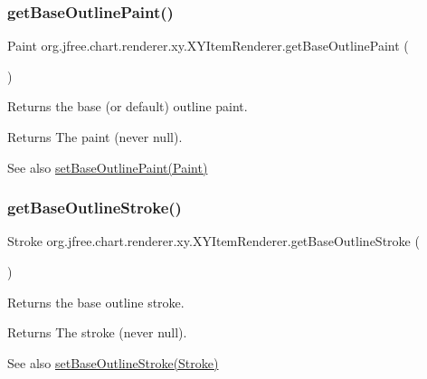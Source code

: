 \subsubsection{\texorpdfstring{get\+Base\+Outline\+Paint()}{getBaseOutlinePaint()}}
{\footnotesize\ttfamily Paint org.\+jfree.\+chart.\+renderer.\+xy.\+X\+Y\+Item\+Renderer.\+get\+Base\+Outline\+Paint (\begin{DoxyParamCaption}{ }\end{DoxyParamCaption})}

Returns the base (or default) outline paint.

\begin{DoxyReturn}{Returns}
The paint (never {\ttfamily null}).
\end{DoxyReturn}
\begin{DoxySeeAlso}{See also}
\mbox{\hyperlink{interfaceorg_1_1jfree_1_1chart_1_1renderer_1_1xy_1_1_x_y_item_renderer_a6b3684a8366e68b2b647b43e5ef200a7}{set\+Base\+Outline\+Paint(\+Paint)}} 
\end{DoxySeeAlso}
\mbox{\label{interfaceorg_1_1jfree_1_1chart_1_1renderer_1_1xy_1_1_x_y_item_renderer_a089616d66c786c07af6a7f2f12b696f2}} 
\subsubsection{\texorpdfstring{get\+Base\+Outline\+Stroke()}{getBaseOutlineStroke()}}
{\footnotesize\ttfamily Stroke org.\+jfree.\+chart.\+renderer.\+xy.\+X\+Y\+Item\+Renderer.\+get\+Base\+Outline\+Stroke (\begin{DoxyParamCaption}{ }\end{DoxyParamCaption})}

Returns the base outline stroke.

\begin{DoxyReturn}{Returns}
The stroke (never {\ttfamily null}).
\end{DoxyReturn}
\begin{DoxySeeAlso}{See also}
\mbox{\hyperlink{interfaceorg_1_1jfree_1_1chart_1_1renderer_1_1xy_1_1_x_y_item_renderer_aab77837ee355fecff3b20d5559727bf3}{set\+Base\+Outline\+Stroke(\+Stroke)}} 
\end{DoxySeeAlso}
\mbox{\label{interfaceorg_1_1jfree_1_1chart_1_1renderer_1_1xy_1_1_x_y_item_renderer_ad429a253d5c1272c0fd26ed0a5cd912c}} 
